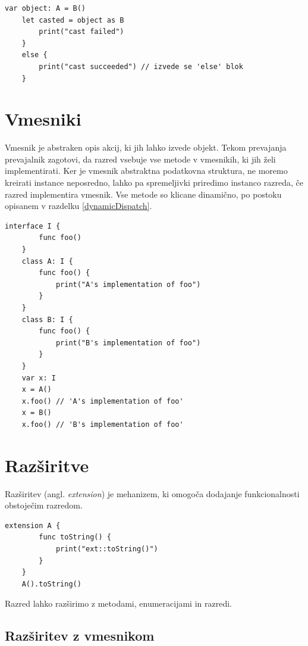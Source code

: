 \documentclass[a4paper, 12p]{book}
\begin{document}
\begin{lstlisting}[caption={Pretvorba za razrede iz sheme ~\ref{vtables}}, captionpos=b]
	var object: A = B()
	let casted = object as B
	    print("cast failed")
	}
	else {
	    print("cast succeeded") // izvede se 'else' blok
	}
\end{lstlisting}

\section{Vmesniki}

Vmesnik je abstraken opis akcij, ki jih lahko izvede objekt. Tekom prevajanja prevajalnik zagotovi, da razred vsebuje vse metode v vmesnikih, ki jih želi implementirati. Ker je vmesnik abstraktna podatkovna struktura, ne moremo kreirati instance neposredno, lahko pa spremeljivki priredimo instanco razreda, če razred implementira vmesnik. Vse metode so klicane dinamično, po postoku opisanem v razdelku \ref{dynamicDispatch}.

\begin{lstlisting}[caption={Vmesniki}, label={lst:interfaces}, captionpos=b]
	interface I {
	    func foo()
	}
	class A: I {
	    func foo() {
	        print("A's implementation of foo")
	    }
	}
	class B: I {
	    func foo() {
	        print("B's implementation of foo")
	    }
	}
	var x: I
	x = A()
	x.foo() // 'A's implementation of foo'
	x = B()
	x.foo() // 'B's implementation of foo'
\end{lstlisting}

\section{Razširitve}

Razširitev (angl. \textit{extension}) je mehanizem, ki omogoča dodajanje funkcionalnosti obstoječim razredom. 

\begin{lstlisting}[caption={Razširitev razreda A}, captionpos=b]
	extension A {
	    func toString() {
	        print("ext::toString()")
	    }
	}
	A().toString()
\end{lstlisting}

Razred lahko razširimo z metodami, enumeracijami in razredi. 

\subsection{Razširitev z vmesnikom}
\end{document}

